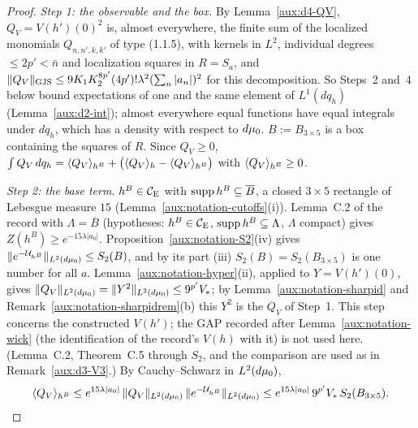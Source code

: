 \begin{proof}
\emph{Step 1: the observable and the box.}  By Lemma~\ref{aux:d4-QV}, $Q_V=V(h')(0)^2$ is, almost
everywhere, the finite sum of the localized monomials $Q_{n,n',k,k'}$ of type (1.1.5), with kernels
in $L^2$, individual degrees $\le2p'<\bar n$ and localization squares in $R=S_a$, and
$\lVert Q_V\rVert_{\mathrm{GJS}}\le9K_1K_2^{8p'}(4p')!\lambda^2(\sum_n|a_n|)^2$ for this decomposition.  So Steps~2 and~4
below bound expectations of one and the same element of $L^1(dq_h)$ (Lemma~\ref{aux:d2-int});
almost everywhere equal functions have equal integrals under $dq_h$, which has a density with
respect to $d\mu_0$.  $B:=B_{3\times5}$ is a box containing the squares of $R$.  Since $Q_V\ge0$,
$\int Q_V\,dq_h=\langle Q_V\rangle_{h^B}+\bigl(\langle Q_V\rangle_{h}-\langle Q_V\rangle_{h^B}\bigr)$ with $\langle Q_V\rangle_{h^B}\ge0$.

\emph{Step 2: the base term.}  $h^B\in\mathcal{C}_{\mathrm E}$ with $\operatorname{supp} h^B\subseteq\overline B$, a closed $3\times5$
rectangle of Lebesgue measure $15$ (Lemma~\ref{aux:notation-cutoffs}(i)).  Lemma~C.2 of the record
with $\Lambda=\overline B$ (hypotheses: $h^B\in\mathcal{C}_{\mathrm E}$, $\operatorname{supp} h^B\subseteq\Lambda$, $\Lambda$
compact) gives $Z(h^B)\ge e^{-15\lambda|a_0|}$.  Proposition~\ref{aux:notation-S2}(iv) gives
$\|e^{-\mathcal U_{h^B}}\|_{L^2(d\mu_0)}\le S_2(B)$, and by its part (iii) $S_2(B)=S_2(B_{3\times5})$ is one
number for all $a$.  Lemma~\ref{aux:notation-hyper}(ii), applied to $Y=V(h')(0)$, gives
$\|Q_V\|_{L^2(d\mu_0)}=\|Y^2\|_{L^2(d\mu_0)}\le9^{p'}V_*$; by Lemma~\ref{aux:notation-sharpid} and
Remark~\ref{aux:notation-sharpidrem}(b) this $Y^2$ is the $Q_V$ of Step~1.  This step concerns
the constructed $V(h')$; the GAP recorded after Lemma~\ref{aux:notation-wick} (the
identification of the record's $V(h)$ with it) is not used here.  (Lemma~C.2, Theorem~C.5
through $S_2$, and the comparison are used as in Remark~\ref{aux:d3-V3}.)  By Cauchy--Schwarz in
$L^2(d\mu_0)$,
\[
 \langle Q_V\rangle_{h^B}\le e^{15\lambda|a_0|}\,\|Q_V\|_{L^2(d\mu_0)}\,\|e^{-\mathcal U_{h^B}}\|_{L^2(d\mu_0)}
 \le e^{15\lambda|a_0|}\,9^{p'}V_*\,S_2(B_{3\times5}) .
\]


\end{proof}
